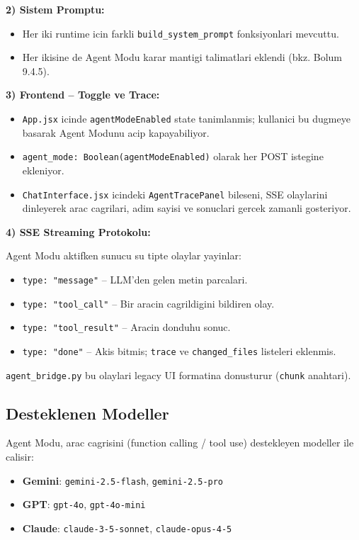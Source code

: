 \documentclass[11pt,a4paper]{article}
\begin{document}
{\textbf{2) Sistem Promptu:}
\begin{itemize}[leftmargin=1.5em]
    \item Her iki runtime icin farkli \texttt{build\_system\_prompt} fonksiyonlari mevcuttu.
    \item Her ikisine de Agent Modu karar mantigi talimatlari eklendi (bkz. Bolum 9.4.5).
\end{itemize}

\textbf{3) Frontend -- Toggle ve Trace:}
\begin{itemize}[leftmargin=1.5em]
    \item \texttt{App.jsx} icinde \texttt{agentModeEnabled} state tanimlanmis; kullanici bu dugmeye basarak Agent Modunu acip kapayabiliyor.
    \item \texttt{agent\_mode: Boolean(agentModeEnabled)} olarak her POST istegine ekleniyor.
    \item \texttt{ChatInterface.jsx} icindeki \texttt{AgentTracePanel} bileseni, SSE olaylarini dinleyerek arac cagrilari, adim sayisi ve sonuclari gercek zamanli gosteriyor.
\end{itemize}

\textbf{4) SSE Streaming Protokolu:}

Agent Modu aktifken sunucu su tipte olaylar yayinlar:
\begin{itemize}[leftmargin=1.5em]
    \item \texttt{type: "message"} -- LLM'den gelen metin parcalari.
    \item \texttt{type: "tool\_call"} -- Bir aracin cagrildigini bildiren olay.
    \item \texttt{type: "tool\_result"} -- Aracin donduhu sonuc.
    \item \texttt{type: "done"} -- Akis bitmis; \texttt{trace} ve \texttt{changed\_files} listeleri eklenmis.
\end{itemize}

\texttt{agent\_bridge.py} bu olaylari legacy UI formatina donusturur (\texttt{chunk} anahtari).

\subsection{Desteklenen Modeller}

Agent Modu, arac cagrisini (function calling / tool use) destekleyen modeller ile calisir:
\begin{itemize}[leftmargin=1.5em]
    \item \textbf{Gemini}: \texttt{gemini-2.5-flash}, \texttt{gemini-2.5-pro}
    \item \textbf{GPT}: \texttt{gpt-4o}, \texttt{gpt-4o-mini}
    \item \textbf{Claude}: \texttt{claude-3-5-sonnet}, \texttt{claude-opus-4-5}
\end{itemize}

}
\end{document}
